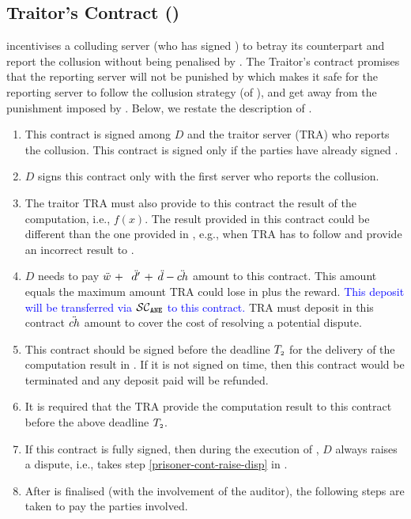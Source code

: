 

\subsection{Traitor's Contract (\SCtc)}

\SCtc incentivises a colluding server (who has signed \SCcc) to betray its counterpart and report the collusion without being penalised by \SCpc.  The Traitor’s contract promises that the reporting server will not be
punished by \SCpc which makes it safe for the reporting server to follow the collusion strategy (of \SCcc), and get away from the punishment imposed by \SCpc. Below, we restate the description of \SCtc. 


\begin{enumerate}
%
\item This contract is signed among $ { D}$ and the traitor server (TRA) who reports the collusion. This contract is signed only if the parties have already signed \SCpc. 
%
\item  $ { D}$ signs this contract only with the first server who reports the collusion. 
%
\item The traitor TRA must also provide to this contract the result of the computation, i.e., $f(x)$. The result provided in this contract could be different than the one provided in \SCpc, e.g., when TRA has to follow \SCcc and provide an incorrect result to \SCpc. 
%
\item  $  D$ needs to pay  $\ddot{w} \ +\ $\textcolor{blue}{ $\ddot{d}' \ + $} $\ddot{d}-\ddot{ch}$ amount to this contract. This amount equals the maximum amount TRA could lose in \SCpc plus the reward. \textcolor{blue}{This deposit will be transferred via $\mathcal{SC}_{\mathtt{ANE}}$ to this contract.}  TRA must deposit in this contract $\ddot{ch}$ amount to cover the cost of resolving a potential dispute.  
%
\item  This contract should be signed before the deadline  $T_{\scriptscriptstyle 2}$  for the delivery of the computation result in \SCpc. If it is not signed on time, then this contract would be terminated and any deposit paid will be refunded.
%
\item It is required that the TRA provide the computation result to this contract before the above deadline $T_{\scriptscriptstyle 2}$.
%
\item If this contract is fully signed, then during the execution of \SCpc, $ { D}$ always raises a dispute, i.e., takes step \ref{prisoner-cont-raise-disp} in \SCpc.
%
\item After \SCpc is finalised (with the involvement of the auditor), the following steps are taken to pay the parties involved.   

\end{enumerate}

